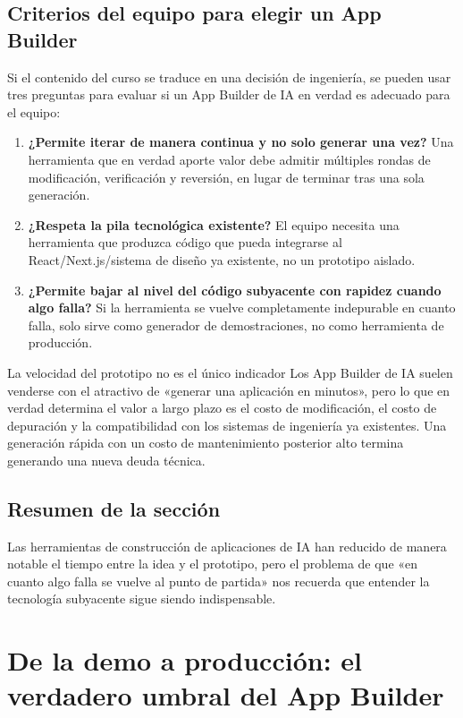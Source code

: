 \documentclass[a4paper]{article}
\begin{document}
\subsection{Criterios del equipo para elegir un App Builder}

Si el contenido del curso se traduce en una decisión de ingeniería, se pueden usar tres preguntas para evaluar si un App Builder de IA en verdad es adecuado para el equipo:

\begin{enumerate}
    \item \textbf{¿Permite iterar de manera continua y no solo generar una vez?} Una herramienta que en verdad aporte valor debe admitir múltiples rondas de modificación, verificación y reversión, en lugar de terminar tras una sola generación.
    \item \textbf{¿Respeta la pila tecnológica existente?} El equipo necesita una herramienta que produzca código que pueda integrarse al React/Next.js/sistema de diseño ya existente, no un prototipo aislado.
    \item \textbf{¿Permite bajar al nivel del código subyacente con rapidez cuando algo falla?} Si la herramienta se vuelve completamente indepurable en cuanto falla, solo sirve como generador de demostraciones, no como herramienta de producción.
\end{enumerate}

\begin{warningbox}{La velocidad del prototipo no es el único indicador}
Los App Builder de IA suelen venderse con el atractivo de «generar una aplicación en minutos», pero lo que en verdad determina el valor a largo plazo es el costo de modificación, el costo de depuración y la compatibilidad con los sistemas de ingeniería ya existentes. Una generación rápida con un costo de mantenimiento posterior alto termina generando una nueva deuda técnica.
\end{warningbox}

\subsection{Resumen de la sección}

Las herramientas de construcción de aplicaciones de IA han reducido de manera notable el tiempo entre la idea y el prototipo, pero el problema de que «en cuanto algo falla se vuelve al punto de partida» nos recuerda que entender la tecnología subyacente sigue siendo indispensable.

\section{De la demo a producción: el verdadero umbral del App Builder}
\end{document}
